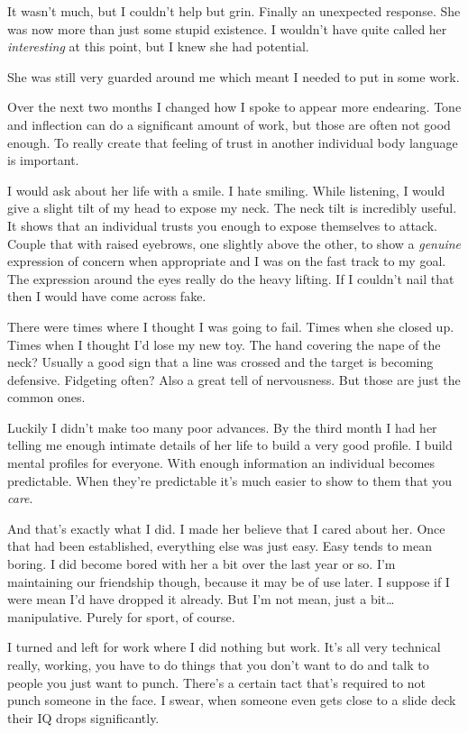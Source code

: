 \noindent
It wasn't much, but I couldn't help but grin.  Finally an unexpected response.
She was now more than just some stupid existence.
I wouldn't have quite called her \textit{interesting} at this point,
but I knew she had potential.
\VV


\noindent
She was still very guarded around me which meant I needed to put in some work.
\VV


\noindent
Over the next two months I changed how I spoke to appear more endearing.
Tone and inflection can do a significant amount of work, but those are often
not good enough.  To really create that feeling of trust in another individual
body language is important.


I would ask about her life with a smile.  I hate smiling.  While listening,
I would give a slight tilt of my head to expose my neck.  The neck tilt is
incredibly useful.  It shows that an individual trusts you enough to
expose themselves to attack. Couple that with raised eyebrows,
one slightly above the other, to show a \textit{genuine} expression of
concern when appropriate and I was on the fast track to my goal.
The expression around the eyes really do the heavy lifting.
If I couldn't nail that then I would have come across fake.


There were times where I thought I was going to fail.  Times when she
closed up.  Times when I thought I'd lose my new toy.
The hand covering the nape of the neck?  Usually a good sign
that a line was crossed and the target is becoming defensive.
Fidgeting often? Also a great tell of nervousness.
But those are just the common ones.


Luckily I didn't make too many poor advances.  By the third month I had her
telling me enough intimate details of her life to build a very good profile.
I build mental profiles for everyone. With enough information
an individual becomes predictable. When they're predictable it's much
easier to show to them that you \textit{care}.


And that's exactly what I did.  I made her believe that I cared about her.
Once that had been established, everything else was just easy.  Easy tends
to mean boring.  I did become bored with her a bit over the last year or so.
I'm maintaining our friendship though, because it may be of use later.
I suppose if I were mean I'd have dropped it already.  But I'm not mean,
just a bit\ldots{}manipulative.  Purely for sport, of course.
\VV


\noindent
I turned and left for work where I did nothing but work.
It's all very technical really, working, you have to do
things that you don't want to do and talk to people you
just want to punch.  There's a certain tact that's
required to not punch someone in the face.
I swear, when someone even gets close to a slide deck
their IQ drops significantly.



